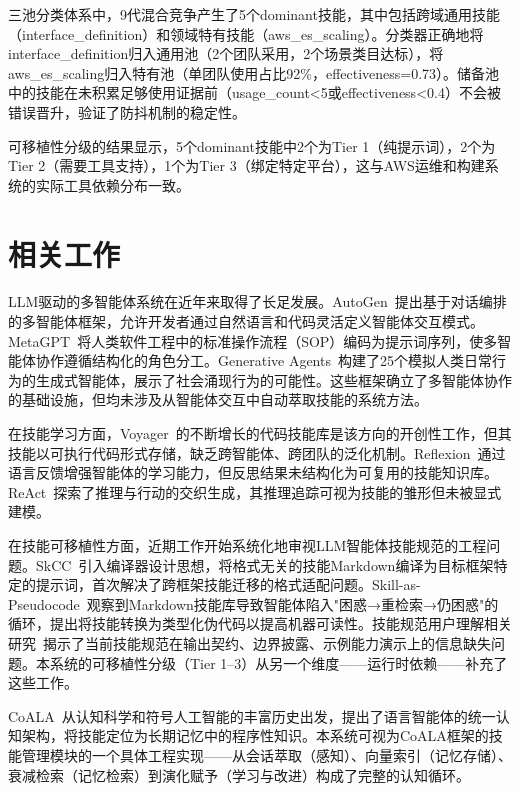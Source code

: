 \documentclass[conference]{IEEEtran}
\begin{document}
三池分类体系中，9代混合竞争产生了5个dominant技能，其中包括跨域通用技能（interface\_definition）和领域特有技能（aws\_es\_scaling）。分类器正确地将interface\_definition归入通用池（2个团队采用，2个场景类目达标），将aws\_es\_scaling归入特有池（单团队使用占比92\%，effectiveness=0.73）。储备池中的技能在未积累足够使用证据前（usage\_count<5或effectiveness<0.4）不会被错误晋升，验证了防抖机制的稳定性。

可移植性分级的结果显示，5个dominant技能中2个为Tier 1（纯提示词），2个为Tier 2（需要工具支持），1个为Tier 3（绑定特定平台），这与AWS运维和构建系统的实际工具依赖分布一致。

\section{相关工作}

LLM驱动的多智能体系统在近年来取得了长足发展。AutoGen~\cite{wu2023autogen}提出基于对话编排的多智能体框架，允许开发者通过自然语言和代码灵活定义智能体交互模式。MetaGPT~\cite{hong2023metagpt}将人类软件工程中的标准操作流程（SOP）编码为提示词序列，使多智能体协作遵循结构化的角色分工。Generative Agents~\cite{park2023generative}构建了25个模拟人类日常行为的生成式智能体，展示了社会涌现行为的可能性。这些框架确立了多智能体协作的基础设施，但均未涉及从智能体交互中自动萃取技能的系统方法。

在技能学习方面，Voyager~\cite{wang2023voyager}的不断增长的代码技能库是该方向的开创性工作，但其技能以可执行代码形式存储，缺乏跨智能体、跨团队的泛化机制。Reflexion~\cite{shinn2023reflexion}通过语言反馈增强智能体的学习能力，但反思结果未结构化为可复用的技能知识库。ReAct~\cite{yao2022react}探索了推理与行动的交织生成，其推理追踪可视为技能的雏形但未被显式建模。

在技能可移植性方面，近期工作开始系统化地审视LLM智能体技能规范的工程问题。SkCC~\cite{skcc2025}引入编译器设计思想，将格式无关的技能Markdown编译为目标框架特定的提示词，首次解决了跨框架技能迁移的格式适配问题。Skill-as-Pseudocode~\cite{skill_pseudocode2025}观察到Markdown技能库导致智能体陷入"困惑→重检索→仍困惑"的循环，提出将技能转换为类型化伪代码以提高机器可读性。技能规范用户理解相关研究~\cite{skill_comprehension2025}揭示了当前技能规范在输出契约、边界披露、示例能力演示上的信息缺失问题。本系统的可移植性分级（Tier 1--3）从另一个维度——运行时依赖——补充了这些工作。

CoALA~\cite{sumers2023coala}从认知科学和符号人工智能的丰富历史出发，提出了语言智能体的统一认知架构，将技能定位为长期记忆中的程序性知识。本系统可视为CoALA框架的技能管理模块的一个具体工程实现——从会话萃取（感知）、向量索引（记忆存储）、衰减检索（记忆检索）到演化赋予（学习与改进）构成了完整的认知循环。
\end{document}

